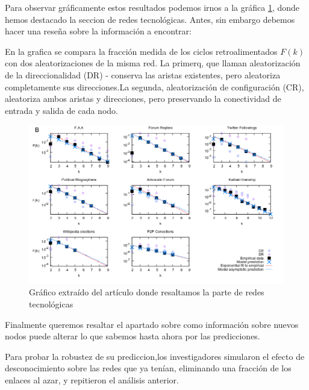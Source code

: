 \documentclass[1p]{elsarticle}
\begin{document}
Para observar gráficamente estos resultados podemos irnos a la gráfica \ref{h1}, donde hemos destacado la seccion de redes tecnológicas. Antes, sin embargo debemos hacer una reseña sobre la información a encontrar:

 En la grafica se compara la fracción medida de los ciclos retroalimentados $F(k)$ con dos aleatorizaciones de la misma red. La primerq, que llaman aleatorización de la direccionalidad (DR) - conserva las aristas existentes, pero aleatoriza completamente sus direcciones.La segunda, aleatorización de configuración (CR), aleatoriza ambos aristas y direcciones, pero preservando la conectividad de entrada y salida de cada nodo.
\begin{figure}
	\centering
	\includegraphics[width=15cm]{graf_2.png}
	\caption{Gráfico extraído del artículo donde resaltamos la parte de redes tecnológicas}
	\label{h1}
\end{figure}

Finalmente queremos resaltar el apartado sobre como información sobre nuevos nodos puede alterar lo que sabemos hasta ahora por las predicciones.

 Para probar la robustez
de su prediccion,los investigadores simularon el efecto de desconocimiento sobre las redes que ya tenían,
eliminando una fracción de los enlaces al azar, y repitieron el análisis anterior. 
\end{document}
